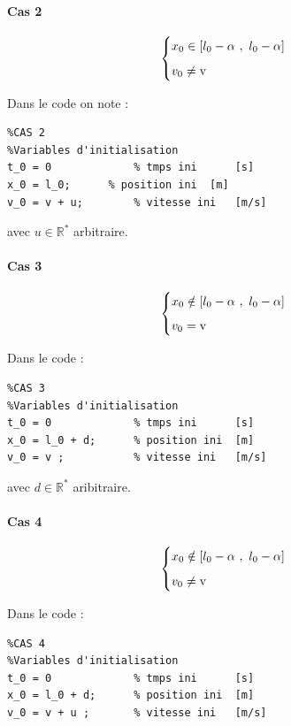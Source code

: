 \documentclass{article}
\begin{document}
\paragraph{Cas 2}
 
$$
\begin{cases}
	\vspace{.2cm}
	x_0 \in [l_0-\alpha~,~l_0-\alpha]\\
	v_0\neq \text{v}
\end{cases}
$$

Dans le code on note :

\begin{lstlisting}
%CAS 2
%Variables d'initialisation
t_0 = 0 			% tmps ini		[s]
x_0 = l_0; 		% position ini	[m]
v_0 = v + u;		% vitesse ini	[m/s]     
\end{lstlisting}

avec $u\in \mathbb{R}^*$ arbitraire.

\paragraph{Cas 3}

$$
\begin{cases}
	\vspace{.2cm}
	x_0 \notin [l_0-\alpha~,~l_0-\alpha]\\
	v_0= \text{v}
\end{cases}
$$

Dans le code :

\begin{lstlisting}
%CAS 3
%Variables d'initialisation
t_0 = 0				% tmps ini		[s]
x_0 = l_0 + d;		% position ini	[m]
v_0 = v ;			% vitesse ini	[m/s]       
\end{lstlisting}

avec $d\in \mathbb{R}^*$ aribitraire.

\paragraph{Cas 4}

$$
\begin{cases}
	\vspace{.2cm}
	x_0 \notin [l_0-\alpha~,~l_0-\alpha]\\
	v_0\neq \text{v}
\end{cases}
$$

Dans le code :

\begin{lstlisting}
%CAS 4
%Variables d'initialisation
t_0 = 0				% tmps ini		[s]
x_0 = l_0 + d;		% position ini	[m]
v_0 = v + u ;		% vitesse ini	[m/s]       
\end{lstlisting}
\end{document}
